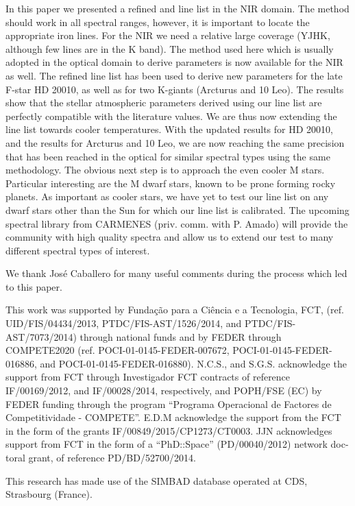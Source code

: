 \documentclass{aa}
\begin{document}
In this paper we presented a refined  and  line list in
the NIR domain. The method should work in all spectral ranges, however, it is
important to locate the appropriate iron lines. For the NIR we need a relative
large coverage (YJHK, although few lines are in the K band). The method used
here which is usually adopted in the optical domain to derive parameters is now
available for the NIR as well. The refined line list has been used to derive new
parameters for the late F-star HD 20010, as well as for two K-giants (Arcturus
and 10 Leo). The results show that the stellar atmospheric parameters derived
using our line list are perfectly compatible with the literature values. We are
thus now extending the line list towards cooler temperatures. With the updated
results for HD 20010, and the results for Arcturus and 10 Leo, we are now
reaching the same precision that has been reached in the optical for similar
spectral types using the same methodology. The obvious next step is to approach
the even cooler M stars. Particular interesting are the M dwarf stars, known to
be prone forming rocky planets. As important as cooler stars, we have yet to
test our line list on any dwarf stars other than the Sun for which our line list
is calibrated. The upcoming spectral library from CARMENES (priv. comm. with P.
Amado) will provide the community with high quality spectra and allow us to
extend our test to many different spectral types of interest.



\begin{acknowledgements}

We thank Jos\'e Caballero for many useful comments during the process which
led to this paper.

This work was supported by Funda\c{c}\~ao para a Ci\^encia e a Tecnologia, FCT,
(ref. UID/FIS/04434/2013, PTDC/FIS-AST/1526/2014, and PTDC/FIS-AST/7073/2014)
through national funds and by FEDER through COMPETE2020 (ref.
POCI-01-0145-FEDER-007672, POCI-01-0145-FEDER-016886, and
POCI-01-0145-FEDER-016880). N.C.S., and S.G.S. acknowledge the support from FCT
through Investigador FCT contracts of reference IF/00169/2012, and
IF/00028/2014, respectively, and POPH/FSE (EC) by FEDER funding through the
program “Programa Operacional de Factores de Competitividade - COMPETE”. E.D.M
acknowledge the support from the FCT in the form of the grants
IF/00849/2015/CP1273/CT0003. JJN acknowledges support from FCT in the form of a
“PhD::Space” (PD/00040/2012) network doc- toral grant, of reference
PD/BD/52700/2014.


This research has made use of the SIMBAD database operated at CDS, Strasbourg
(France).

\end{acknowledgements}
\end{document}
